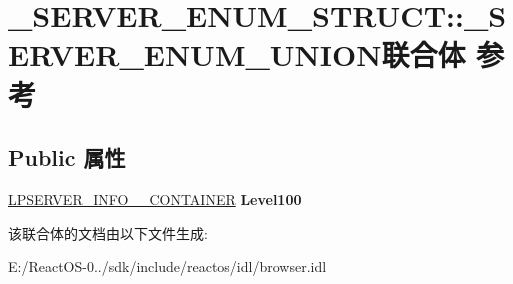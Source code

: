 \hypertarget{union___s_e_r_v_e_r___e_n_u_m___s_t_r_u_c_t_1_1___s_e_r_v_e_r___e_n_u_m___u_n_i_o_n}{}\section{\+\_\+\+S\+E\+R\+V\+E\+R\+\_\+\+E\+N\+U\+M\+\_\+\+S\+T\+R\+U\+CT\+:\+:\+\_\+\+S\+E\+R\+V\+E\+R\+\_\+\+E\+N\+U\+M\+\_\+\+U\+N\+I\+O\+N联合体 参考}
\label{union___s_e_r_v_e_r___e_n_u_m___s_t_r_u_c_t_1_1___s_e_r_v_e_r___e_n_u_m___u_n_i_o_n}
\subsection*{Public 属性}
\begin{DoxyCompactItemize}
\item 
\mbox{\label{union___s_e_r_v_e_r___e_n_u_m___s_t_r_u_c_t_1_1___s_e_r_v_e_r___e_n_u_m___u_n_i_o_n_a742f9e0f7772c604ac531486a91f29e5}} 
\hyperlink{struct___s_e_r_v_e_r___i_n_f_o__100___c_o_n_t_a_i_n_e_r}{L\+P\+S\+E\+R\+V\+E\+R\+\_\+\+I\+N\+F\+O\+\_\+\_\+\+C\+O\+N\+T\+A\+I\+N\+ER} {\bfseries Level100}
\end{DoxyCompactItemize}


该联合体的文档由以下文件生成\+:\begin{DoxyCompactItemize}
\item 
E\+:/\+React\+O\+S-\/0../sdk/include/reactos/idl/browser.\+idl\end{DoxyCompactItemize}
